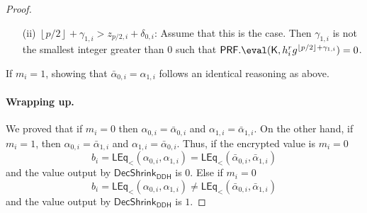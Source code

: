 \begin{proof}
\begin{enumerate}
     \item[(ii)] $\left\lfloor p/2\right\rfloor + \gamma_{1,i} > z_{p/2,i} + \delta_{0,i}$: Assume that this is the case. Then $\gamma_{1,i}$ is not the smallest integer greater than $0$ such that $\PRF.\eval(\key,h_i^rg^{\left\lfloor p/2\right\rfloor + \gamma_{1,i}})=0$.
\end{enumerate}
If $m_i=1$, showing that  $\bar \alpha_{0,i}=\alpha_{1,i}$ follows an identical reasoning as above.



\paragraph{Wrapping up.} We proved that if $m_i=0$ then $\alpha_{0,i}=\bar \alpha_{0,i}$ and $\alpha_{1,i}=\bar \alpha_{1,i}$. On the other hand, if $m_i=1$, then $\alpha_{0,i}=\bar \alpha_{1,i}$ and $\alpha_{1,i}=\bar \alpha_{0,i}$. Thus, if the encrypted value is $m_i=0$ $$b_i=\mathsf{LEq}_<(\alpha_{0,i},\alpha_{1,i})=\mathsf{LEq}_<(\bar \alpha_{0,i},\bar \alpha_{1,i})$$ and the value output by $\mathsf{DecShrink}_\mathsf{DDH}$ is $0$. Else if $m_i=0$ $$b_i=\mathsf{LEq}_<(\alpha_{0,i},\alpha_{1,i})\neq \mathsf{LEq}_<(\bar \alpha_{0,i},\bar \alpha_{1,i})$$ and the value output by $\mathsf{DecShrink}_\mathsf{DDH}$ is $1$.
\end{proof}






